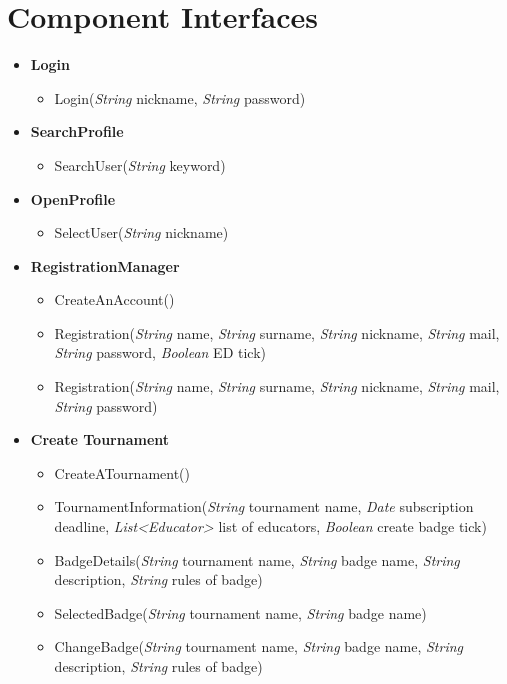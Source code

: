 \section{Component Interfaces}
\label{sec:component_interfaces}%
\begin{itemize}
    \item \textbf{\textbf{Login}}
    \begin{itemize}

\item Login(\textit{String} nickname, \textit{String} password)
\end{itemize}
    \item \textbf{\textbf{SearchProfile}}


    \begin{itemize}

\item SearchUser(\textit{String} keyword)
\end{itemize}


    \item \textbf{\textbf{OpenProfile}}
    \begin{itemize}

\item SelectUser(\textit{String} nickname)

\end{itemize}


    \item \textbf{\textbf{RegistrationManager}}

\begin{itemize}
        \item CreateAnAccount()
        \item Registration(\textit{String} name, \textit{String} surname, \textit{String} nickname, \textit{String} mail, \textit{String} password, \textit{Boolean}  ED tick)
        \item Registration(\textit{String} name, \textit{String} surname, \textit{String} nickname, \textit{String} mail, \textit{String} password)
\end{itemize}

    \item \textbf{\textbf{Create Tournament}}

\begin{itemize}
        \item CreateATournament()
        \item TournamentInformation(\textit{String} tournament name, \textit{Date} subscription deadline, \textit{List\textless Educator\textgreater}  list of educators, \textit{Boolean} create badge tick)
        \item BadgeDetails(\textit{String} tournament name, \textit{String} badge name, \textit{String} description, \textit{String} rules of badge)
        \item SelectedBadge(\textit{String} tournament name, \textit{String} badge name)
        \item ChangeBadge(\textit{String} tournament name, \textit{String} badge name, \textit{String} description, \textit{String} rules of badge)
\end{itemize}


\end{itemize}
